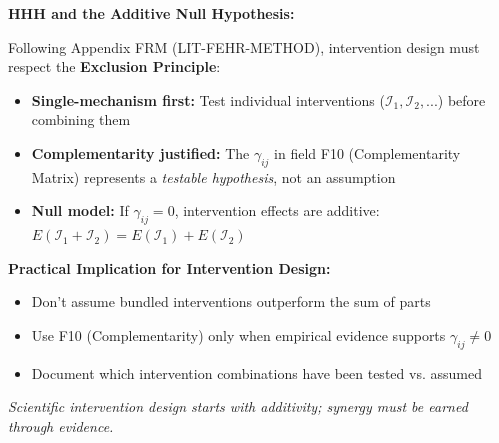 \begin{tcolorbox}[colback=red!5!white, colframe=red!75!black,
    title=\textbf{Methodological Note: Exclusion Principle (Appendix FRM)}]

\textbf{HHH and the Additive Null Hypothesis:}

Following Appendix FRM (LIT-FEHR-METHOD), intervention design must respect the \textbf{Exclusion Principle}:

\begin{itemize}[nosep]
    \item \textbf{Single-mechanism first:} Test individual interventions ($\mathcal{I}_1, \mathcal{I}_2, ...$) before combining them
    \item \textbf{Complementarity justified:} The $\gamma_{ij}$ in field F10 (Complementarity Matrix) represents a \textit{testable hypothesis}, not an assumption
    \item \textbf{Null model:} If $\gamma_{ij} = 0$, intervention effects are additive: $E(\mathcal{I}_1 + \mathcal{I}_2) = E(\mathcal{I}_1) + E(\mathcal{I}_2)$
\end{itemize}

\medskip
\textbf{Practical Implication for Intervention Design:}
\begin{itemize}[nosep]
    \item Don't assume bundled interventions outperform the sum of parts
    \item Use F10 (Complementarity) only when empirical evidence supports $\gamma_{ij} \neq 0$
    \item Document which intervention combinations have been tested vs. assumed
\end{itemize}

\textit{Scientific intervention design starts with additivity; synergy must be earned through evidence.}
\end{tcolorbox}



